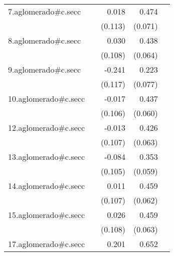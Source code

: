 {\begin{longtable}{l*{4}{D{.}{.}{-1}}}
\addlinespace
7.aglomerado#c.secc&                     &       0.018         &       0.474\sym{***}&                     \\
            &                     &     (0.113)         &     (0.071)         &                     \\
\addlinespace
8.aglomerado#c.secc&                     &       0.030         &       0.438\sym{***}&                     \\
            &                     &     (0.108)         &     (0.064)         &                     \\
\addlinespace
9.aglomerado#c.secc&                     &      -0.241\sym{*}  &       0.223\sym{**} &                     \\
            &                     &     (0.117)         &     (0.077)         &                     \\
\addlinespace
10.aglomerado#c.secc&                     &      -0.017         &       0.437\sym{***}&                     \\
            &                     &     (0.106)         &     (0.060)         &                     \\
\addlinespace
12.aglomerado#c.secc&                     &      -0.013         &       0.426\sym{***}&                     \\
            &                     &     (0.107)         &     (0.063)         &                     \\
\addlinespace
13.aglomerado#c.secc&                     &      -0.084         &       0.353\sym{***}&                     \\
            &                     &     (0.105)         &     (0.059)         &                     \\
\addlinespace
14.aglomerado#c.secc&                     &       0.011         &       0.459\sym{***}&                     \\
            &                     &     (0.107)         &     (0.062)         &                     \\
\addlinespace
15.aglomerado#c.secc&                     &       0.026         &       0.459\sym{***}&                     \\
            &                     &     (0.108)         &     (0.063)         &                     \\
\addlinespace
17.aglomerado#c.secc&                     &       0.201         &       0.652\sym{***}&                     \\

\end{longtable}}
